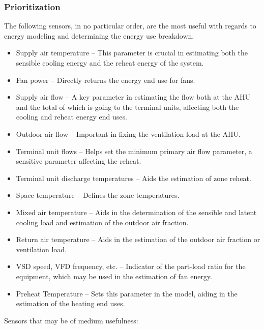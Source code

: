 \subsubsection{Prioritization} \label{sec:Prioritization}
The following sensors, in no particular order, are the most useful with
regards to energy modeling and determining the energy use breakdown. 
\begin{itemize}
\item Supply air temperature -- This parameter is crucial in estimating both the sensible cooling energy and the reheat energy of the system. 
\item Fan power -- Directly returns the energy end use for fans.
\item Supply air flow -- A key parameter in estimating the flow both at the AHU and the total of which is going to the terminal units, affecting both the cooling and reheat energy end uses.
\item Outdoor air flow -- Important in fixing the ventilation load at the AHU.
\item Terminal unit flows -- Helps set the minimum primary air flow parameter, a sensitive parameter affecting the reheat. 
\item Terminal unit discharge temperatures -- Aids the estimation of
    zone reheat. 
\item Space temperature -- Defines the zone temperatures. 
\item Mixed air temperature -- Aids in the determination of the sensible
    and latent cooling load and estimation of the outdoor air fraction.
\item Return air temperature -- Aids in the estimation of the outdoor air fraction or ventilation load.
\item VSD speed, VFD frequency, etc. -- Indicator of the part-load ratio for the equipment, which may be used in the estimation of fan energy. 
\item Preheat Temperature -- Sets this parameter in the model, aiding in the estimation of the heating end uses.
\end{itemize}

Sensors that may be of medium usefulness:

